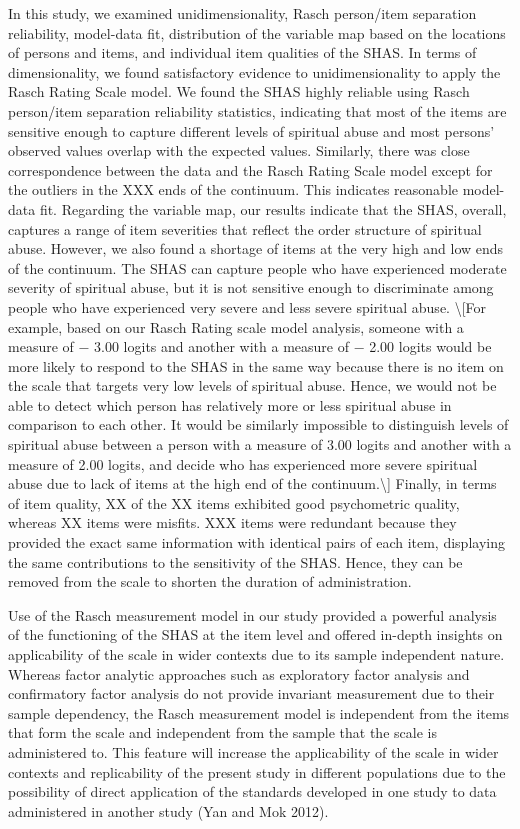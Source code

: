 \documentclass[
  letterpaper,
  DIV=11,
  numbers=noendperiod]{scrreport}
\begin{document}
In this study, we examined unidimensionality, Rasch person/item
separation reliability, model-data fit, distribution of the variable map
based on the locations of persons and items, and individual item
qualities of the SHAS. In terms of dimensionality, we found satisfactory
evidence to unidimensionality to apply the Rasch Rating Scale model. We
found the SHAS highly reliable using Rasch person/item separation
reliability statistics, indicating that most of the items are sensitive
enough to capture different levels of spiritual abuse and most persons'
observed values overlap with the expected values. Similarly, there was
close correspondence between the data and the Rasch Rating Scale model
except for the outliers in the XXX ends of the continuum. This indicates
reasonable model-data fit. Regarding the variable map, our results
indicate that the SHAS, overall, captures a range of item severities
that reflect the order structure of spiritual abuse. However, we also
found a shortage of items at the very high and low ends of the
continuum. The SHAS can capture people who have experienced moderate
severity of spiritual abuse, but it is not sensitive enough to
discriminate among people who have experienced very severe and less
severe spiritual abuse. \textbackslash{[}For example, based on our Rasch
Rating scale model analysis, someone with a measure of − 3.00 logits and
another with a measure of − 2.00 logits would be more likely to respond
to the SHAS in the same way because there is no item on the scale that
targets very low levels of spiritual abuse. Hence, we would not be able
to detect which person has relatively more or less spiritual abuse in
comparison to each other. It would be similarly impossible to
distinguish levels of spiritual abuse between a person with a measure of
3.00 logits and another with a measure of 2.00 logits, and decide who
has experienced more severe spiritual abuse due to lack of items at the
high end of the continuum.\textbackslash{]} Finally, in terms of item
quality, XX of the XX items exhibited good psychometric quality, whereas
XX items were misfits. XXX items were redundant because they provided
the exact same information with identical pairs of each item, displaying
the same contributions to the sensitivity of the SHAS. Hence, they can
be removed from the scale to shorten the duration of administration.

Use of the Rasch measurement model in our study provided a powerful
analysis of the functioning of the SHAS at the item level and offered
in-depth insights on applicability of the scale in wider contexts due to
its sample independent nature. Whereas factor analytic approaches such
as exploratory factor analysis and confirmatory factor analysis do not
provide invariant measurement due to their sample dependency, the Rasch
measurement model is independent from the items that form the scale and
independent from the sample that the scale is administered to. This
feature will increase the applicability of the scale in wider contexts
and replicability of the present study in different populations due to
the possibility of direct application of the standards developed in one
study to data administered in another study (Yan and Mok 2012).
\end{document}
